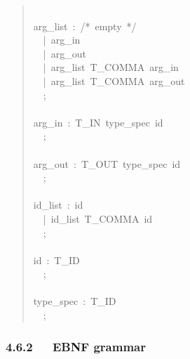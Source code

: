 \documentclass[a4paper]{article}
\begin{document}
\begin{quote}
{~\\
arg\_list~:~/*~empty~*/\\
~~|~arg\_in\\
~~|~arg\_out\\
~~|~arg\_list~T\_COMMA~arg\_in\\
~~|~arg\_list~T\_COMMA~arg\_out\\
~~;\\
~\\
arg\_in~:~T\_IN~type\_spec~id\\
~~;\\
~\\
arg\_out~:~T\_OUT~type\_spec~id\\
~~;\\
~\\
id\_list~:~id\\
~~|~id\_list~T\_COMMA~id\\
~~;\\
~\\
id~:~T\_ID\\
~~;\\
~\\
type\_spec~:~T\_ID\\
~~;
}
\end{quote}


\subsubsection{4.6.2~~~EBNF grammar%
  \label{ebnf-grammar}%
}
\end{document}

